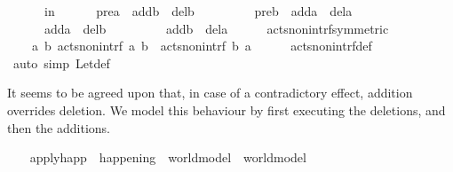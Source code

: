 \begin{isabellebody}
\ \ \ \ \ \ in\isanewline
\ \ \ \ \ \ pre\isactrlsub a\ {\isasyminter}\ {\isacharparenleft}{\kern0pt}add\isactrlsub b\ {\isasymunion}\ del\isactrlsub b{\isacharparenright}{\kern0pt}\ {\isacharequal}{\kern0pt}\ {\isacharbraceleft}{\kern0pt}{\isacharbraceright}{\kern0pt}\ {\isasymand}\isanewline
\ \ \ \ \ \ pre\isactrlsub b\ {\isasyminter}\ {\isacharparenleft}{\kern0pt}add\isactrlsub a\ {\isasymunion}\ del\isactrlsub a{\isacharparenright}{\kern0pt}\ {\isacharequal}{\kern0pt}\ {\isacharbraceleft}{\kern0pt}{\isacharbraceright}{\kern0pt}\ {\isasymand}\isanewline
\ \ \ \ \ \ add\isactrlsub a\ {\isasyminter}\ del\isactrlsub b\ {\isacharequal}{\kern0pt}\ {\isacharbraceleft}{\kern0pt}{\isacharbraceright}{\kern0pt}\ {\isasymand}\isanewline
\ \ \ \ \ \ add\isactrlsub b\ {\isasyminter}\ del\isactrlsub a\ {\isacharequal}{\kern0pt}\ {\isacharbraceleft}{\kern0pt}{\isacharbraceright}{\kern0pt}{\isacharparenright}{\kern0pt}{\isachardoublequoteclose}\isanewline
\isanewline
\ \ \isamarkupfalse%
\ acts{\isacharunderscore}{\kern0pt}non{\isacharunderscore}{\kern0pt}intrf{\isacharunderscore}{\kern0pt}symmetric{\isacharcolon}{\kern0pt}\ \isanewline
\ \ \ \ {\isachardoublequoteopen}{\isasymforall}a\ b{\isachardot}{\kern0pt}\ acts{\isacharunderscore}{\kern0pt}non{\isacharunderscore}{\kern0pt}intrf\ a\ b\ {\isasymlongleftrightarrow}\ acts{\isacharunderscore}{\kern0pt}non{\isacharunderscore}{\kern0pt}intrf\ b\ a{\isachardoublequoteclose}\isanewline
%
\isadelimproof
\ \ \ \ %
\endisadelimproof
%
\isatagproof
{}\isamarkupfalse%
\ acts{\isacharunderscore}{\kern0pt}non{\isacharunderscore}{\kern0pt}intrf{\isacharunderscore}{\kern0pt}def\ \isamarkupfalse%
\ {\isacharparenleft}{\kern0pt}auto\ simp{\isacharcolon}{\kern0pt}\ Let{\isacharunderscore}{\kern0pt}def{\isacharparenright}{\kern0pt}%
\endisatagproof
{\isafoldproof}%
%
\isadelimproof
%
\endisadelimproof
%
\begin{isamarkuptext}%
It seems to be agreed upon that, in case of a contradictory effect,
    addition overrides deletion. We model this behaviour by first executing
    the deletions, and then the additions.%
\end{isamarkuptext}\isamarkuptrue%
\ \ \isamarkupfalse%
\ apply{\isacharunderscore}{\kern0pt}happ\ {\isacharcolon}{\kern0pt}{\isacharcolon}{\kern0pt}\ {\isachardoublequoteopen}happening\ {\isasymRightarrow}\ world{\isacharunderscore}{\kern0pt}model\ {\isasymRightarrow}\ world{\isacharunderscore}{\kern0pt}model{\isachardoublequoteclose}\ \isanewline

\end{isabellebody}
